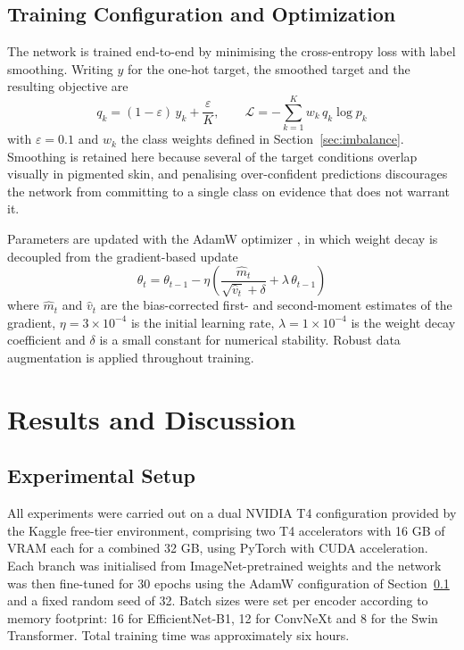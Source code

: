 \documentclass[pdflatex,sn-mathphys-num]{sn-jnl}%
\begin{document}
\subsection{Training Configuration and Optimization}\label{sec:training}

The network is trained end-to-end by minimising the cross-entropy loss with label smoothing.
Writing $y$ for the one-hot target, the smoothed target and the resulting objective are
\begin{equation}
q_{k} = (1 - \varepsilon)\, y_{k} + \frac{\varepsilon}{K}, \qquad
\mathcal{L} = -\sum_{k=1}^{K} w_{k}\, q_{k} \log p_{k}
\end{equation}
with $\varepsilon = 0.1$ and $w_{k}$ the class weights defined in
Section~\ref{sec:imbalance}. Smoothing is retained here because several of the target
conditions overlap visually in pigmented skin, and penalising over-confident predictions
discourages the network from committing to a single class on evidence that does not warrant
it.

Parameters are updated with the AdamW optimizer \cite{ref26}, in which weight decay is
decoupled from the gradient-based update
\begin{equation}
\theta_{t} = \theta_{t-1} - \eta \left( \frac{\hat{m}_{t}}{\sqrt{\hat{v}_{t}} + \delta}
+ \lambda\, \theta_{t-1} \right)
\end{equation}
where $\hat{m}_{t}$ and $\hat{v}_{t}$ are the bias-corrected first- and second-moment
estimates of the gradient, $\eta = 3 \times 10^{-4}$ is the initial learning rate,
$\lambda = 1 \times 10^{-4}$ is the weight decay coefficient and $\delta$ is a small constant
for numerical stability. Robust data augmentation is applied throughout training.

\section{Results and Discussion}\label{sec:results}

\subsection{Experimental Setup}\label{sec:expsetup}

All experiments were carried out on a dual NVIDIA T4 configuration provided by the Kaggle
free-tier environment, comprising two T4 accelerators with 16 GB of VRAM each for a combined
32 GB, using PyTorch with CUDA acceleration. Each branch was initialised from
ImageNet-pretrained weights and the network was then fine-tuned for 30 epochs using the AdamW
configuration of Section~\ref{sec:training} and a fixed random seed of 32. Batch sizes were
set per encoder according to memory footprint: 16 for EfficientNet-B1, 12 for ConvNeXt and 8
for the Swin Transformer. Total training time was approximately six hours.
\end{document}
